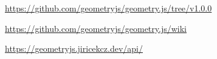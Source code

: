 \label{chap:attachments}
\url{https://github.com/geometryjs/geometry.js/tree/v1.0.0}

\url{https://github.com/geometryjs/geometry.js/wiki}

\url{https://geometryjs.jiricekcz.dev/api/}
\openright